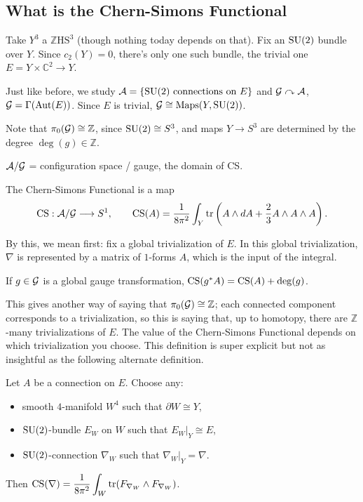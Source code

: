\documentclass[main]{subfiles}
\begin{document}
\subsection*{What is the Chern-Simons Functional}

Take $Y^3$ a $\mathbb{Z}\mathrm{HS}^3$ (though nothing today depends on that). Fix an $\operatorname{SU}(2)$ bundle over $Y$. Since $c_2(Y)=0$, there's only one such bundle, the trivial one $E = Y\times\mathbb{C}^2 \to Y$.

Just like before, we study $\mathcal{A} = \{\operatorname{SU}(2) \text{ connections on } E\}$ and $\mathcal{G}\curvearrowright \mathcal{A}$, $\mathcal{G} = \Gamma(\operatorname{Aut}(E))$. Since $E$ is trivial, $\mathcal{G} \cong \operatorname{Maps}(Y,\operatorname{SU}(2))$.

Note that $\pi_0(\mathcal{G})\cong \mathbb{Z}$, since $\operatorname{SU}(2)\cong S^3$, and maps $Y\to S^3$ are determined by the degree $\deg(g)\in \mathbb{Z}$.

$\mathcal{A}/\mathcal{G}$ = configuration space / gauge, the domain of CS.

\begin{definition}
The Chern-Simons Functional is a map
\[
\operatorname{CS} : \mathcal{A}/\mathcal{G} \longrightarrow S^1, \qquad \operatorname{CS}(A) = \frac{1}{8\pi^2}\int_Y \operatorname{tr}\left(A\wedge dA + \frac{2}{3}A\wedge A\wedge A\right).
\]
\end{definition}

By this, we mean first: fix a global trivialization of $E$. In this global trivialization, $\nabla$ is represented by a matrix of $1$-forms $A$, which is the input of the integral.

\begin{exercise}
If $g\in\mathcal{G}$ is a global gauge transformation, $\operatorname{CS}(g^\ast A) = \operatorname{CS}(A) + \deg(g)$.
\end{exercise}

This gives another way of saying that $\pi_0(\mathcal{G})\cong \mathbb{Z}$; each connected component corresponds to a trivialization, so this is saying that, up to homotopy, there are $\mathbb{Z}$-many trivializations of $E$. The value of the Chern-Simons Functional depends on which trivialization you choose. This definition is super explicit but not as insightful as the following alternate definition.

\begin{definition}
Let $A$ be a connection on $E$. Choose any:
\begin{itemize}
\item smooth $4$-manifold $W^4$ such that $\partial W\cong Y$,
\item $\operatorname{SU}(2)$-bundle $E_W$ on $W$ such that $E_W|_Y \cong E$,
\item $\operatorname{SU}(2)$-connection $\nabla_W$ such that $\nabla_W|_Y = \nabla$.
\end{itemize}
Then $\operatorname{CS}(\nabla) = \dfrac{1}{8\pi^2}\displaystyle\int_W \operatorname{tr}(F_{\nabla_W}\wedge F_{\nabla_W})$.
\end{definition}
\end{document}
